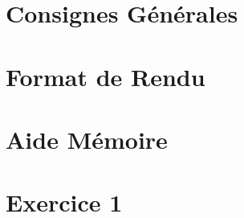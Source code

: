 \documentclass[12pt,a4paper]{article}
\begin{document}
\maketitle





\newpage

\tableofcontents

\newpage

\section{Consignes Générales}

\bigskip



\newpage

\section{Format de Rendu}
\label{sec:FormatDeRendu}

\vspace*{1cm}



\newpage

\section{Aide Mémoire}
\label{sec:AideMemoire}

\vspace*{1cm}




\newpage


\section{Exercice 1}

\vspace*{0.7cm}



\newpage
\end{document}
